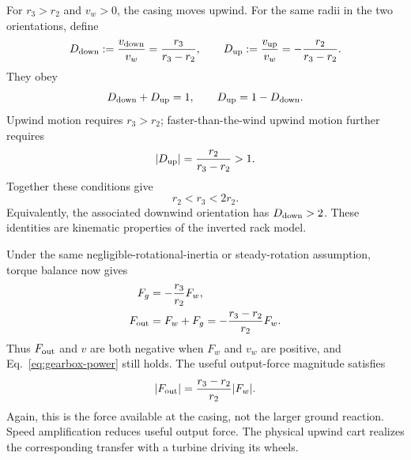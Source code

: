 \documentclass[reprint,aps,pra,longbibliography]{revtex4-2}
\begin{document}
For \(r_3>r_2\) and \(v_w>0\), the casing moves upwind. For the same radii in the two orientations, define
\[
D_{\rm down}:=\frac{v_{\rm down}}{v_w}=\frac{r_3}{r_3-r_2},
\qquad
D_{\rm up}:=\frac{v_{\rm up}}{v_w}=-\frac{r_2}{r_3-r_2}.
\]
They obey
\begin{equation}
D_{\rm down}+D_{\rm up}=1,
\qquad D_{\rm up}=1-D_{\rm down}.
\label{eq:upwind-downwind-symmetry}
\end{equation}
Upwind motion requires \(r_3>r_2\); faster-than-the-wind upwind motion further requires
\[
|D_{\rm up}|=\frac{r_2}{r_3-r_2}>1.
\]
Together these conditions give
\begin{equation}
r_2<r_3<2r_2.
\label{eq:upwind-amplification-condition}
\end{equation}
Equivalently, the associated downwind orientation has \(D_{\rm down}>2\). These identities are kinematic properties of the inverted rack model.



Under the same negligible-rotational-inertia or steady-rotation assumption, torque balance now gives
\begin{align}
F_g&=-\frac{r_3}{r_2}F_w,
\label{eq:upwind-ground-force}\\
F_{\rm out}&=F_w+F_g=-\frac{r_3-r_2}{r_2}F_w.
\label{eq:upwind-output-force}
\end{align}
Thus \(F_{\rm out}\) and \(v\) are both negative when \(F_w\) and \(v_w\) are positive, and Eq.~\eqref{eq:gearbox-power} still holds. The useful output-force magnitude satisfies
\begin{equation}
|F_{\rm out}|=\frac{r_3-r_2}{r_2}|F_w|.
\label{eq:upwind-force-ratio}
\end{equation}
Again, this is the force available at the casing, not the larger ground reaction. Speed amplification reduces useful output force. The physical upwind cart realizes the corresponding transfer with a turbine driving its wheels.
\end{document}
